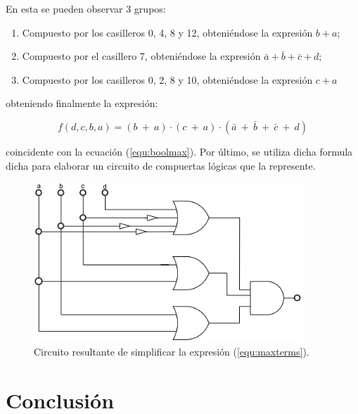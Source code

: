 \documentclass[a4paper]{article}
\begin{document}
En esta se pueden observar 3 grupos:
\begin{enumerate}
	\item Compuesto por los casilleros 0, 4, 8 y 12, obteniéndose la expresión $ b + a $;
	\item Compuesto por el casillero 7, obteniéndose la expresión $ \bar{a} + \bar{b} + \bar{c} + d $;
	\item Compuesto por los casilleros 0, 2, 8 y 10, obteniéndose la expresión $ c + a $
\end{enumerate}

obteniendo finalmente la expresión: 

\begin{equation}
	f \left( d,c,b,a \right) = \left( b \ + \ a \right) \cdot \left( c \ + \ a \right) \cdot \left( \bar{a} \ + \ \bar{b} \ + \ \bar{c} \ + \ d \right)
\end{equation}

coincidente con la ecuación	(\ref{equ:boolmax}). Por último, se utiliza dicha formula dicha para elaborar un circuito de compuertas lógicas que la represente.

\begin{figure}[H]
	\centering
	\includegraphics[width=0.9\textwidth]{Circuito2.PNG}
\caption{Circuito resultante de simplificar la expresión (\ref{equ:maxterms}).}
	\label{fig:circ2}
\end{figure}


\section*{Conclusión}
\end{document}
